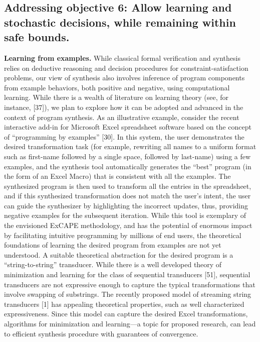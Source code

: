 \subsection{Addressing objective 6: Allow learning and stochastic decisions, while remaining within safe bounds.}


\textbf{Learning from examples.} While classical formal verification and synthesis relies on deductive reasoning and decision procedures for constraint-satisfaction problems, our view of synthesis also involves inference of program components from example behaviors, both positive and negative, using computational learning. While there is a wealth of literature on learning theory (see, for instance, [37]), we plan to explore how it can be adopted and advanced in the context of program synthesis. As an illustrative example, consider the recent interactive add-in for Microsoft Excel spreadsheet software based on the concept of “programming by examples” [30]. In this system, the user demonstrates the desired transformation task (for example, rewriting all names to a uniform format such as first-name followed by a single space, followed by last-name) using a few examples, and the synthesis tool automatically generates the “best” program (in the form of an Excel Macro) that is consistent with all the examples. The synthesized program is then used to transform all the entries in the spreadsheet, and if this synthesized transformation does not match the user’s intent, the user can guide the synthesizer by highlighting the incorrect updates, thus, providing negative examples for the subsequent iteration. While this tool is exemplary of the envisioned ExCAPE methodology, and has the potential of enormous impact by facilitating intuitive programming by millions of end users, the theoretical foundations of learning the desired program from examples are not yet understood. A suitable theoretical abstraction for the desired program is a “string-to-string” transducer. While there is a well developed theory of minimization and learning for the class of sequential transducers [51], sequential transducers are not expressive enough to capture the typical transformations that involve swapping of substrings. The recently proposed model of streaming string transducers [1] has appealing theoretical properties, such as well characterized expressiveness. Since this model can capture the desired Excel transformations, algorithms for minimization and learning—a topic for proposed research, can lead to efficient synthesis procedure with guarantees of convergence.


